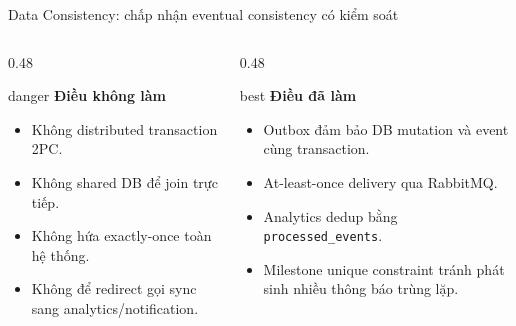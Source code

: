 \documentclass[aspectratio=169]{beamer}
\begin{document}
\begin{frame}{Data Consistency: chấp nhận eventual consistency có kiểm soát}
    \begin{columns}[T,onlytextwidth]
        \begin{column}{0.48\textwidth}
            \begin{claimbox}{danger}
                \textbf{Điều không làm}
                \begin{itemize}\small
                    \item Không distributed transaction 2PC.
                    \item Không shared DB để join trực tiếp.
                    \item Không hứa exactly-once toàn hệ thống.
                    \item Không để redirect gọi sync sang analytics/notification.
                \end{itemize}
            \end{claimbox}
        \end{column}
        \begin{column}{0.48\textwidth}
            \begin{claimbox}{best}
                \textbf{Điều đã làm}
                \begin{itemize}\small
                    \item Outbox đảm bảo DB mutation và event cùng transaction.
                    \item At-least-once delivery qua RabbitMQ.
                    \item Analytics dedup bằng \texttt{processed\_events}.
                    \item Milestone unique constraint tránh phát sinh nhiều thông báo trùng lặp.
                \end{itemize}
            \end{claimbox}
        \end{column}
    \end{columns}
\end{frame}
\end{document}
